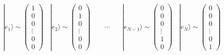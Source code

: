 \documentclass[letterpaper,10pt,english]{jupyterBook}
\begin{document}
\begin{equation*}
\begin{split}
|e_1\rangle \sim \begin{pmatrix} 1 \\ 0 \\ 0\\ \vdots 
\\ 0 \\ 0 \end{pmatrix}~~~~
|e_2\rangle \sim \begin{pmatrix} 0 \\ 1 \\ 0\\ \vdots 
\\ 0 \\ 0 \end{pmatrix}~~~~~~~~~
\cdots ~~~~~~~~
|e_{N-1}\rangle \sim \begin{pmatrix} 0 \\ 0 \\ 0\\\vdots 
\\ 1 \\ 0 \end{pmatrix}~~~~
|e_N\rangle \sim \begin{pmatrix} 0 \\ 0 \\0\\ \vdots 
\\ 0 \\ 1 \end{pmatrix}
\end{split}
\end{equation*}
\end{document}
